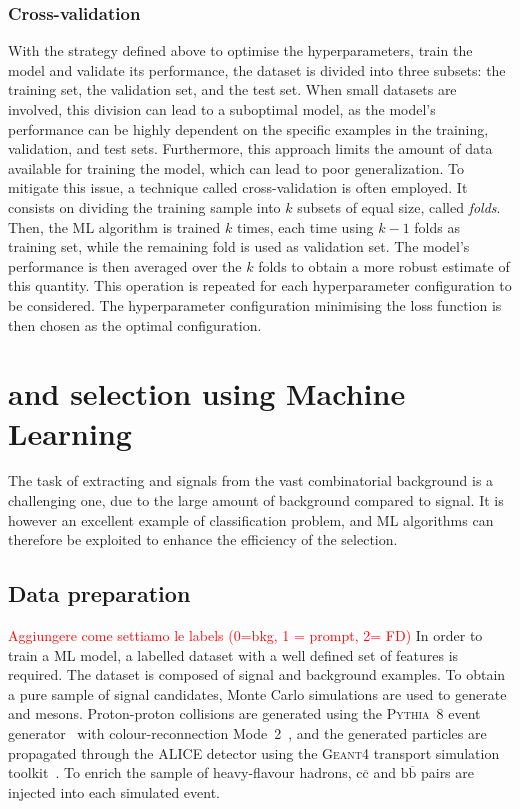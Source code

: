 \subsubsection{Cross-validation}

With the strategy defined above to optimise the hyperparameters, train the model and validate its performance, the dataset is divided into three subsets: the training set, the validation set, and the test set. When small datasets are involved, this division can lead to a suboptimal model, as the model's performance can be highly dependent on the specific examples in the training, validation, and test sets. Furthermore, this approach limits the amount of data available for training the model, which can lead to poor generalization. To mitigate this issue, a technique called cross-validation is often employed. It consists on dividing the training sample into $k$ subsets of equal size, called \emph{folds}. Then, the ML algorithm is trained $k$ times, each time using $k-1$ folds as training set, while the remaining fold is used as validation set. The model's performance is then averaged over the $k$ folds to obtain a more robust estimate of this quantity. This operation is repeated for each hyperparameter configuration to be considered. The hyperparameter configuration minimising the loss function is then chosen as the optimal configuration.

\section{\texorpdfstring{\ds and \dpl selection using Machine Learning}{Ds+ and D+ selection using Machine Learning}}

The task of extracting \ds and \dpl signals from the vast combinatorial background is a challenging one, due to the large amount of background compared to signal. It is however an excellent example of classification problem, and ML algorithms can therefore be exploited to enhance the efficiency of the selection. 

\subsection{Data preparation}\label{sec:ml_data_preparation}
\textcolor{red}{Aggiungere come settiamo le labels (0=bkg, 1 = prompt, 2= FD)}
In order to train a ML model, a labelled dataset with a well defined set of features is required. The dataset is composed of signal and background examples. To obtain a pure sample of signal candidates, Monte Carlo simulations are used to generate \ds and \dpl mesons. Proton-proton collisions are generated using the \textsc{Pythia~8} event generator~\cite{Bierlich:2022pfr} with colour-reconnection Mode~2~\cite{Christiansen:2015yqa}, and the generated particles are propagated through the ALICE detector using the \textsc{Geant4} transport simulation toolkit~\cite{GEANT4:2002zbu}. To enrich the sample of heavy-flavour hadrons, $\mathrm{c\overline{c}}$ and $\mathrm{b\overline{b}}$ pairs are injected into each simulated event. 


